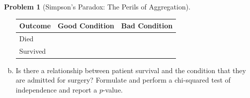 \documentclass[10pt]{amsart}
\theoremstyle{definition}
\newtheorem{problem}[theorem]{Problem}
\newcommand{\1}[1]{\textbf{1}_{\left[#1\right]}} %
\begin{document}
\begin{problem}[Simpson's Paradox: The Perils of Aggregation]
\begin{enumerate}[(a)]
\begin{center}
\begin{tabular}{|l|c|c|}
        \hline
        \textbf{Outcome} & \textbf{Good Condition} & \textbf{Bad Condition} \\
        \hline
        Died     &    $\phantom{\displaystyle\int}$    &        \\
        \hline
        Survived &        &        $\phantom{\displaystyle\int}$\\ 
        \hline
      \end{tabular}
    \end{center}
    \item Is there a relationship between patient survival and the condition
    that they are admitted for surgery? Formulate and perform a chi-squared
    test of independence and report a $p$-value.
  \end{enumerate}
\end{problem}
\end{document}
